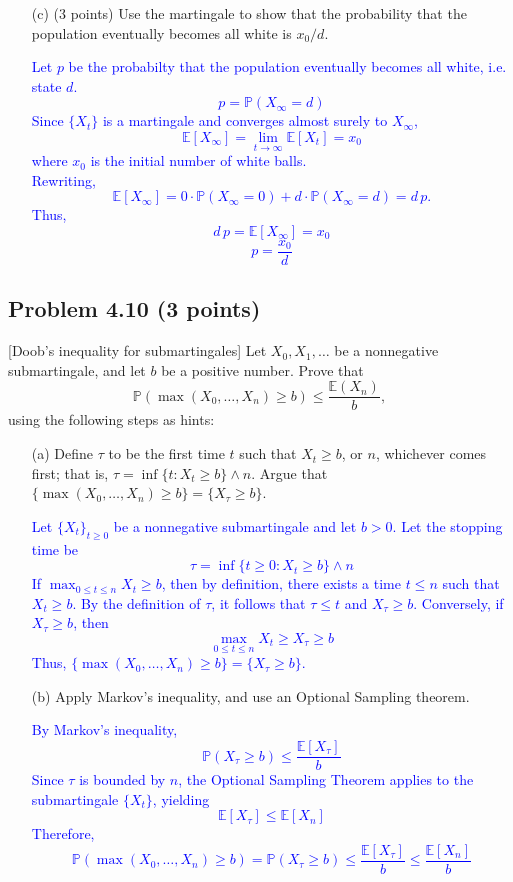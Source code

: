 \documentclass{article}
\begin{document}
\begin{enumerate}
    \item[(c)] (3 points) Use the martingale to show that the probability that the population eventually becomes all white is $x_0 / d$.

    \textcolor{blue}{Let $p$ be the probabilty that the population eventually becomes all white, i.e. state $d$. 
\[
p = \mathbb{P}(X_\infty = d)
\]
Since $\{X_t\}$ is a martingale and converges almost surely to $X_\infty$,
\[
\mathbb{E}[X_\infty] = \lim_{t\to\infty}\mathbb{E}[X_t] = x_0
\]
where $x_0$ is the initial number of white balls. \\
Rewriting,
\[
\mathbb{E}[X_\infty] = 0\cdot \mathbb{P}(X_\infty = 0) + d\cdot \mathbb{P}(X_\infty = d) = d\,p.
\]
Thus,
\[
    d\,p = \mathbb{E}[X_\infty]= x_0 
\]
\[
    p = \frac{x_0}{d}
\]
}

\end{enumerate}

\subsection*{Problem 4.10 (3 points)}
[Doob’s inequality for submartingales] Let $X_0, X_1, \ldots$ be a nonnegative submartingale, and let $b$ be a positive number. Prove that
\[
\mathbb{P}(\max(X_0, \ldots, X_n) \geq b) \leq \frac{\mathbb{E}(X_n)}{b},
\]
using the following steps as hints:

\begin{enumerate}
    \item[(a)] Define $\tau$ to be the first time $t$ such that $X_t \geq b$, or $n$, whichever comes first; that is, $\tau = \inf\{t : X_t \geq b\} \wedge n$. Argue that $\{\max(X_0, \ldots, X_n) \geq b\} = \{X_\tau \geq b\}$.

        \textcolor{blue}{Let $\{X_t\}_{t\ge0}$ be a nonnegative submartingale and let $b>0$. Let the stopping time be
\[
\tau = \inf\{t \ge 0 : X_t \ge b\} \wedge n
\]
If $\max_{0\le t\le n} X_t \ge b$, then by definition, there exists a time $t \le n$ such that $X_t \ge b$. By the definition of $\tau$, it follows that $\tau \le t$ and $X_\tau \ge b$. Conversely, if $X_\tau \ge b$, then
\[
\max_{0\le t\le n} X_t \ge X_\tau \ge b
\]
Thus, $\{\max(X_0, \ldots, X_n) \geq b\} = \{X_\tau \geq b\}$. }

    \item[(b)] Apply Markov’s inequality, and use an Optional Sampling theorem.

        \textcolor{blue}{By Markov's inequality,
\[
\mathbb{P}(X_\tau \ge b) \le \frac{\mathbb{E}[X_\tau]}{b}
\]
Since $\tau$ is bounded by $n$, the Optional Sampling Theorem applies to the submartingale $\{X_t\}$, yielding
\[
\mathbb{E}[X_\tau] \le \mathbb{E}[X_n]
\]
Therefore, 
\[
\mathbb{P}\left(\max(X_0, \ldots, X_n) \geq b\right) = \mathbb{P}(X_\tau \ge b) \le \frac{\mathbb{E}[X_\tau]}{b} \le \frac{\mathbb{E}[X_n]}{b}
\]}
\end{enumerate}
\end{document}
